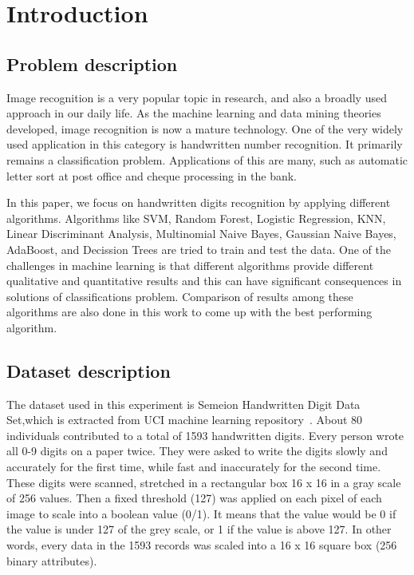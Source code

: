 \documentclass[letterpaper,10pt]{article}
\theoremstyle{mytheor}
\begin{document}
\newpage

\section{Introduction}

\subsection{Problem description}

Image recognition is a very popular topic in research, and also a broadly used approach in our daily life. As the machine learning and data mining theories developed, image recognition is now a mature technology. One of the very widely used application in this category is handwritten number recognition. It primarily remains a classification problem. Applications of this  are many, such as automatic letter sort at post office and cheque processing in the bank.

In this paper, we focus on handwritten digits recognition by applying different algorithms. Algorithms like SVM, Random Forest, Logistic Regression, KNN, Linear Discriminant Analysis, Multinomial Naive Bayes, Gaussian Naive Bayes, AdaBoost, and Decission Trees are tried to train and test the data. One of the challenges in machine learning is that different algorithms provide different qualitative and quantitative results and this can have significant consequences in solutions of classifications problem. Comparison of results among these algorithms are also done in this work to come up with the best performing algorithm.

\subsection{Dataset description}

The dataset used in this experiment is Semeion Handwritten Digit Data Set,which is extracted from UCI machine learning repository~\cite{semeion}. About 80 individuals contributed to a total of 1593 handwritten digits. Every person wrote all 0-9 digits on a paper twice. They were asked to write the digits slowly and accurately for the first time, while fast and inaccurately for the second time. These digits were scanned, stretched in a rectangular box 16 x 16 in a gray scale of 256 values. Then a fixed threshold (127) was applied on each pixel of each image to scale into a boolean value (0/1). It means that the value would be 0 if the value is under 127 of the grey scale, or 1 if the value is above 127. In other words, every data in the 1593 records was scaled into a 16 x 16 square box (256 binary attributes).
\end{document}
